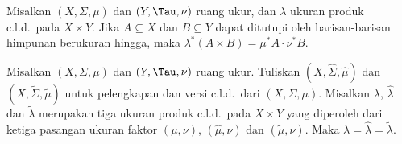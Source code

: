  Misalkan $(X,\Sigma,\mu)$ dan $(Y,\Tau,\nu)$
ruang ukur, dan $\lambda$ ukuran produk c.l.d.\
pada $X\times Y$. Jika
$A\subseteq X$ dan $B\subseteq Y$ dapat ditutupi oleh barisan-barisan himpunan
berukuran hingga, maka $\lambda^*(A\times
B)=\mu^*A\cdot\nu^*B$.


 Misalkan $(X,\Sigma,\mu)$ dan $(Y,\Tau,\nu)$
ruang ukur. Tuliskan $(X,\hat\Sigma,\hat\mu)$ dan
$(X,\tilde\Sigma,\tilde\mu)$ untuk pelengkapan dan versi c.l.d.\ dari
$(X,\Sigma,\mu)$\cmmnt{ (212C, 213E)}. Misalkan $\lambda$, $\hat\lambda$
dan $\tilde\lambda$ merupakan tiga ukuran produk c.l.d.\ pada $X\times Y$
yang diperoleh dari ketiga pasangan ukuran faktor $(\mu,\nu)$,
$(\hat\mu,\nu)$ dan $(\tilde\mu,\nu)$. Maka
$\lambda=\hat\lambda=\tilde\lambda$.

